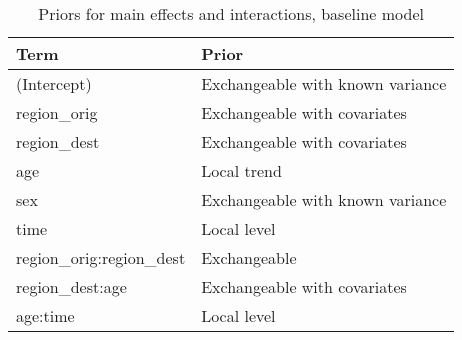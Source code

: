 \begin{table}[ht]
\centering
\caption{Priors for main effects and interactions, baseline model} 
\label{tab:priors_Baseline}
\begin{tabular}{ll}
  \hline
Term & Prior \\ 
  \hline
(Intercept) & Exchangeable with known variance \\ 
  region\_orig & Exchangeable with covariates \\ 
  region\_dest & Exchangeable with covariates \\ 
  age & Local trend \\ 
  sex & Exchangeable with known variance \\ 
  time & Local level \\ 
  region\_orig:region\_dest & Exchangeable \\ 
  region\_dest:age & Exchangeable with covariates \\ 
  age:time & Local level \\ 
   \hline
\end{tabular}
\end{table}
